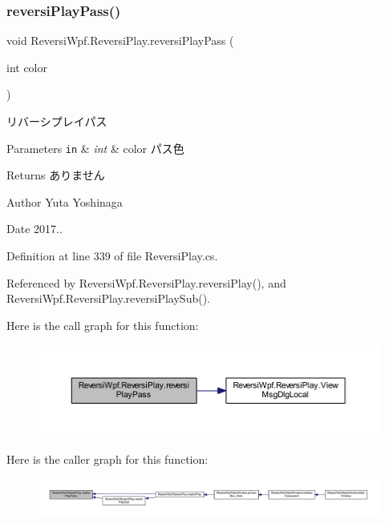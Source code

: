 \subsubsection{\texorpdfstring{reversi\+Play\+Pass()}{reversiPlayPass()}}
{\footnotesize\ttfamily void Reversi\+Wpf.\+Reversi\+Play.\+reversi\+Play\+Pass (\begin{DoxyParamCaption}\item[{int}]{color }\end{DoxyParamCaption})}



リバーシプレイパス 


\begin{DoxyParams}[1]{Parameters}
\mbox{\tt in}  & {\em int} & color パス色 \\
\hline
\end{DoxyParams}
\begin{DoxyReturn}{Returns}
ありません 
\end{DoxyReturn}
\begin{DoxyAuthor}{Author}
Yuta Yoshinaga 
\end{DoxyAuthor}
\begin{DoxyDate}{Date}
2017.. 
\end{DoxyDate}


Definition at line 339 of file Reversi\+Play.\+cs.



Referenced by Reversi\+Wpf.\+Reversi\+Play.\+reversi\+Play(), and Reversi\+Wpf.\+Reversi\+Play.\+reversi\+Play\+Sub().

Here is the call graph for this function\+:
\nopagebreak
\begin{figure}[H]
\begin{center}
\leavevmode
\includegraphics[width=350pt]{class_reversi_wpf_1_1_reversi_play_a3aca2f66c873be50dca194a396d34bd7_cgraph}
\end{center}
\end{figure}
Here is the caller graph for this function\+:
\nopagebreak
\begin{figure}[H]
\begin{center}
\leavevmode
\includegraphics[width=350pt]{class_reversi_wpf_1_1_reversi_play_a3aca2f66c873be50dca194a396d34bd7_icgraph}
\end{center}
\end{figure}
\mbox{\label{class_reversi_wpf_1_1_reversi_play_ae7e23ef808336291a39f0ac37687d1dc}} 
